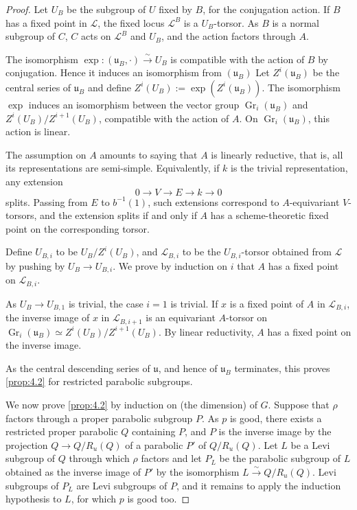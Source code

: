 \documentclass[11pt,a4paper]{article}
\theoremstyle{plain}
\theoremstyle{definition}
\DeclareMathOperator{\Gr}{Gr}
\begin{document}
\begin{proof}
Let $U_B$ be the subgroup of $U$ fixed by $B$, for the conjugation action. If $B$ has a fixed point in $\mathcal{L}$, the fixed locus $\mathcal{L}^B$ is a $U_B$-torsor. As $B$ is a normal subgroup of $C$, $C$ acts on $\mathcal{L}^B$ and $U_B$, and the action factors through $A$.

The isomorphism $\exp : (\mathfrak{u}_B, \cdot) \xrightarrow{\sim} U_B$ is compatible with the action of $B$ by conjugation. Hence it induces an isomorphism from $(\mathfrak{u}_B)$ Let $Z^i(\mathfrak{u}_B)$ be the central series of $\mathfrak{u}_B$ and define $Z^i(U_B) := \exp(Z^i(\mathfrak{u}_B))$. The isomorphism $\exp$ induces an isomorphism between the vector group $\Gr_i(\mathfrak{u}_B)$ and $Z^i(U_B)/Z^{i+1}(U_B)$, compatible with the action of $A$. On $\Gr_i(\mathfrak{u}_B)$, this action is linear.

The assumption on $A$ amounts to saying that $A$ is linearly reductive, that is, all its representations are semi-simple. Equivalently, if $k$ is the trivial representation, any extension
\begin{equation} \label{eq:4.2.3}
0 \to V \to E \to k \to 0
\end{equation}
splits. Passing from $E$ to $b^{-1}(1)$, such extensions correspond to $A$-equivariant $V$-torsors, and the extension splits if and only if $A$ has a scheme-theoretic fixed point on the corresponding torsor.

Define $U_{B,i}$ to be $U_B/Z^i(U_B)$, and $\mathcal{L}_{B,i}$ to be the $U_{B,i}$-torsor obtained from $\mathcal{L}$ by pushing by $U_B \to U_{B,i}$. We prove by induction on $i$ that $A$ has a fixed point on $\mathcal{L}_{B,i}$.

As $U_B \to U_{B,1}$ is trivial, the case $i=1$ is trivial. If $x$ is a fixed point of $A$ in $\mathcal{L}_{B,i}$, the inverse image of $x$ in $\mathcal{L}_{B,i+1}$ is an equivariant $A$-torsor on $\Gr_i(\mathfrak{u}_B) \simeq Z^i(U_B)/Z^{i+1}(U_B)$. By linear reductivity, $A$ has a fixed point on the inverse image.

As the central descending series of $\mathfrak{u}$, and hence of $\mathfrak{u}_B$ terminates, this proves \ref{prop:4.2} for restricted parabolic subgroups.

We now prove \ref{prop:4.2} by induction on (the dimension) of $G$. Suppose that $\rho$ factors through a proper parabolic subgroup $P$. As $p$ is good, there exists a restricted proper parabolic $Q$ containing $P$, and $P$ is the inverse image by the projection $Q \to Q/R_u(Q)$ of a parabolic $P'$ of $Q/R_u(Q)$. Let $L$ be a Levi subgroup of $Q$ through which $\rho$ factors and let $P_L$ be the parabolic subgroup of $L$ obtained as the inverse image of $P'$ by the isomorphism $L \xrightarrow{\sim} Q/R_u(Q)$. Levi subgroups of $P_L$ are Levi subgroups of $P$, and it remains to apply the induction hypothesis to $L$, for which $p$ is good too. \qedhere
\end{proof}
\end{document}
